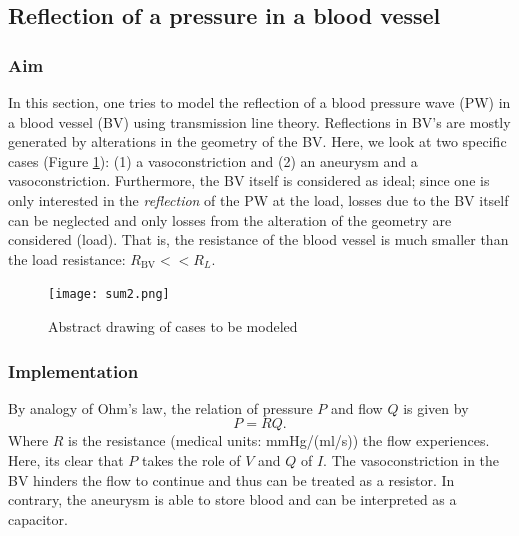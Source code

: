 \subsection{Reflection of a pressure in a blood vessel}
\subsubsection{Aim}



In this section, one tries to model the reflection of a blood pressure wave (PW) in a blood vessel (BV) using transmission line theory. Reflections in BV's are mostly generated by alterations in the geometry of the BV. Here, we look at two specific cases (Figure \ref{fig:model}): (1) a vasoconstriction and (2) an aneurysm and a vasoconstriction. Furthermore, the BV itself is considered as ideal;  since one is only interested in the \textit{reflection} of the PW at the load, losses due to the BV itself can be neglected and only losses from the alteration of the geometry are considered (load). That is, the resistance of the blood vessel is much smaller than the load resistance: $R_{\text{BV}} << R_L$. 

\begin{figure}[h!]
\centering
\texttt{[image: sum2.png]}
\caption{Abstract drawing of cases to be modeled}\label{fig:model}
\end{figure}

\subsubsection{Implementation}
By analogy of Ohm's law, the relation of pressure $P$ and flow $Q$ is given by
\begin{equation}
P = RQ.
\end{equation}
Where $R$ is the resistance (medical units: mmHg/(ml/s)) the flow experiences. Here, its clear that $P$ takes the role of $V$ and $Q$ of $I$. The vasoconstriction in the BV hinders the flow to continue and thus can be treated as a resistor. In contrary, the aneurysm is able to store blood and can be interpreted as a capacitor.\\
 
